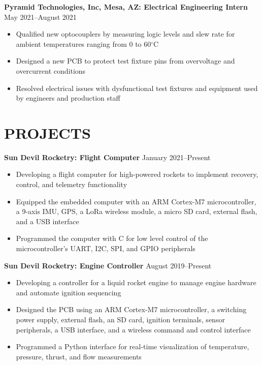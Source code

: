 \documentclass{article}
\begin{document}
\textbf{Pyramid Technologies, Inc, Mesa, AZ: Electrical Engineering Intern}
\hfill 
\vspace{0.5em}
May 2021--August 2021
\begin{itemize}
\item{Qualified new optocouplers by measuring logic levels and slew rate for ambient temperatures ranging from 0 to 60$^{\circ}$C}
\item{Designed a new PCB to protect test fixture pins from overvoltage and overcurrent conditions}
\item{Resolved electrical issues with dysfunctional test fixtures and equipment used by engineers and production staff}
\end{itemize}
\section{PROJECTS}
\textbf{Sun Devil Rocketry: Flight Computer}
\hfill
\vspace{0.5em}
January 2021--Present
\begin{itemize}
\item{Developing a flight computer for high-powered rockets to implement recovery, control, and telemetry functionality}
\item{Equipped the embedded computer with an ARM Cortex-M7 microcontroller, a 9-axis IMU, GPS, a LoRa wireless module, a micro SD card, external flash, and a USB interface}
\item{Programmed the computer with C for low level control of the microcontroller's UART, I2C, SPI, and GPIO peripherals}
\end{itemize}
\vspace{1em}
\textbf{Sun Devil Rocketry: Engine Controller}
\hfill
\vspace{0.5em}
August 2019--Present
\begin{itemize}
\item{Developing a controller for a liquid rocket engine to manage engine hardware and automate ignition sequencing}
\item{Designed the PCB using an ARM Cortex-M7 microcontroller, a switching power supply, external flash, an SD card, ignition terminals, sensor peripherals, a USB interface, and a wireless command and control interface}
\item{Programmed a Python interface for real-time visualization of temperature, pressure, thrust, and flow measurements}
\end{itemize}
\vspace{1em}
\thispagestyle{empty}
\end{document}
